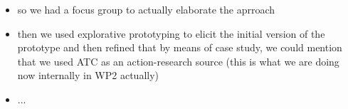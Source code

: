 \begin{itemize}
\item so we had a focus group to actually elaborate the aprroach 
\item then we used explorative prototyping to elicit the initial version of the prototype and then refined that by means of case study, we could mention that we used ATC as an action-research source (this is what we are doing now internally in WP2 actually)
\item ...
\end{itemize}